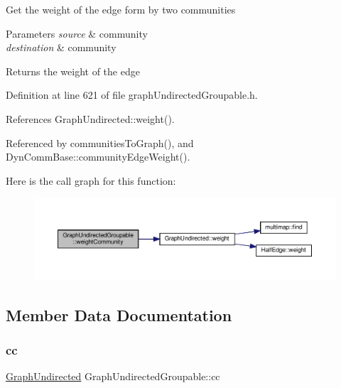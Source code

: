 Get the weight of the edge form by two communities


\begin{DoxyParams}{Parameters}
{\em source} & community \\
\hline
{\em destination} & community \\
\hline
\end{DoxyParams}
\begin{DoxyReturn}{Returns}
the weight of the edge 
\end{DoxyReturn}


Definition at line 621 of file graph\+Undirected\+Groupable.\+h.



References Graph\+Undirected\+::weight().



Referenced by communities\+To\+Graph(), and Dyn\+Comm\+Base\+::community\+Edge\+Weight().

Here is the call graph for this function\+:\nopagebreak
\begin{figure}[H]
\begin{center}
\leavevmode
\includegraphics[width=350pt]{classGraphUndirectedGroupable_a2884361f00176ac8f16afca6feb3e404_cgraph}
\end{center}
\end{figure}


\subsection{Member Data Documentation}
\mbox{\label{classGraphUndirectedGroupable_aa76c119ec662942ae958b0463764a919}} 
\subsubsection{\texorpdfstring{cc}{cc}}
{\footnotesize\ttfamily \hyperlink{classGraphUndirected}{Graph\+Undirected} Graph\+Undirected\+Groupable\+::cc\hspace{0.3cm}{\ttfamily [private]}}



